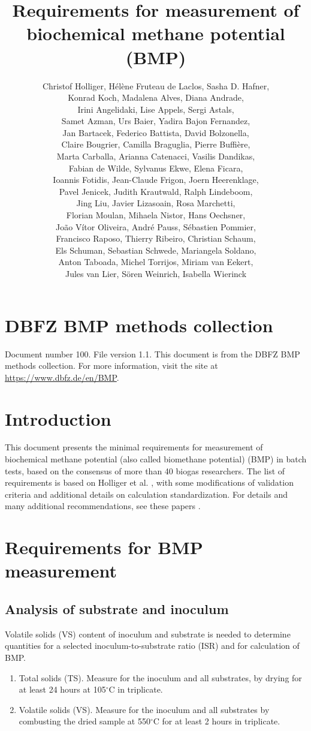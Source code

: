 \documentclass[]{article}
\title {Requirements for measurement of biochemical methane potential (BMP)}
\author{
Christof Holliger, 
H{\'e}l{\`e}ne Fruteau de Laclos,
Sasha D. Hafner,\\
Konrad Koch,
Madalena Alves, 
Diana Andrade,\\
Irini Angelidaki,
Lise Appels,
Sergi Astals, \\
Samet Azman,
Urs Baier,
Yadira Bajon Fernandez,\\
Jan Bartacek,
Federico Battista,
David Bolzonella,\\
Claire Bougrier,
Camilla Braguglia,
Pierre Buffi{\`e}re,\\
Marta Carballa,
Arianna Catenacci,
Vasilis Dandikas,\\
Fabian de Wilde,
Sylvanus Ekwe,
Elena Ficara,\\
Ioannis Fotidis,
Jean-Claude Frigon, 
Joern Heerenklage,\\
Pavel Jenicek,
Judith Krautwald,
Ralph Lindeboom,\\
Jing Liu,
Javier Lizasoain,
Rosa Marchetti,\\
Florian Moulan,
Mihaela Nistor,
Hans Oechsner,\\
Jo{\~a}o V{\'i}tor Oliveira,
Andr{\'e} Pauss,
S{\'e}bastien Pommier,\\
Francisco Raposo,
Thierry Ribeiro,
Christian Schaum,\\
Els Schuman,
Sebastian Schwede,
Mariangela Soldano,\\
Anton Taboada,
Michel Torrijos, 
Miriam van Eekert,\\
Jules van Lier,
S{\"o}ren Weinrich, 
Isabella Wierinck
}
\begin{document}
\maketitle

\section{DBFZ BMP methods collection}
Document number 100.
File version 1.1. 
This document is from the DBFZ BMP methods collection.
For more information, visit the site at \url{https://www.dbfz.de/en/BMP}.

\section{Introduction}
This document presents the minimal requirements for measurement of biochemical methane potential (also called biomethane potential) (BMP) in batch tests, based on the consensus of more than 40 biogas researchers.
The list of requirements is based on Holliger et al. \cite{iis2016}, with some modifications of validation criteria \cite{iis2020} and additional details on calculation standardization.
For details and many additional recommendations, see these papers \cite{iis2016,iis2020}.

\section{Requirements for BMP measurement}
\subsection{Analysis of substrate and inoculum}
\label{sec:analysis}
  Volatile solids (VS) content of inoculum and substrate is needed to determine quantities for a selected inoculum-to-substrate ratio (ISR) and for calculation of BMP.
  \begin{enumerate}
    \item Total solids (TS). Measure for the inoculum and all substrates, by drying for at least 24 hours at 105$^\circ$C in triplicate.
    \item Volatile solids (VS). Measure for the inoculum and all substrates by combusting the dried sample at 550$^\circ$C for at least 2 hours in triplicate.
  \end{enumerate}
\end{document}
